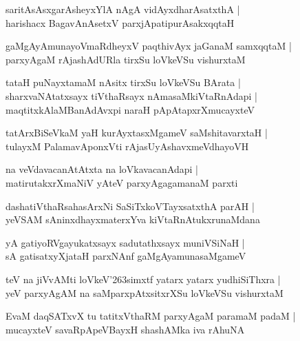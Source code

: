 \documentclass[twoside,12pt,openright]{book}
\def\S{\char'263}
\newcounter{shloka}[chapter]
\begin{document}
\begin{shloka}
saritAsAsxgarAsheyxYlA nAgA vidAyxdharAsatxthA |\\
harishacx BagavAnAsetxV parxjApatipurAsakxqqtaH 
\end{shloka}

\begin{shloka}
gaMgAyAmunayoVmaRdheyxV paqthivAyx jaGanaM samxqqtaM |\\
parxyAgaM rAjashAdURla tirxSu loVkeVSu vishurxtaM 
\end{shloka}

\begin{shloka}
tataH puNayxtamaM nAsitx tirxSu loVkeVSu BArata |\\
sharxvaNAtatxsayx tiVthaRsayx nAmasaMkiVtaRnAdapi |\\
maqtitxkAlaMBanAdAvxpi naraH pApAtapxrXmucayxteV 
\end{shloka}

\begin{shloka}
tatArxBiSeVkaM yaH kurAyxtasxMgameV saMshitavarxtaH |\\
tulayxM PalamavAponxVti rAjasUyAshavxmeVdhayoVH
\end{shloka}

\begin{shloka}
na veVdavacanAtAtxta na loVkavacanAdapi |\\
matirutakxrXmaNiV yAteV parxyAgagamanaM parxti 
\end{shloka}

\begin{shloka}
dashatiVthaRsahasArxNi SaSiTxkoVTayxsatxthA parAH |\\
yeVSAM sAninxdhayxmaterxYva kiVtaRnAtukxrunaMdana 
\end{shloka}

\begin{shloka}
yA gatiyoRVgayukatxsayx sadutathxsayx muniVSiNaH |\\
sA gatisatxyXjataH parxNAnf gaMgAyamunasaMgameV 
\end{shloka}

\begin{shloka}
teV na jiVvAMti loVkeV\S simxtf yatarx yatarx yudhiSiThxra |\\
yeV parxyAgAM na saMparxpAtxsitxrXSu loVkeVSu vishurxtaM 
\end{shloka}

\begin{shloka}
EvaM daqSATxvX tu tatitxVthaRM parxyAgaM paramaM padaM |\\
mucayxteV savaRpApeVBayxH shashAMka iva rAhuNA 
\end{shloka}
\end{document}
